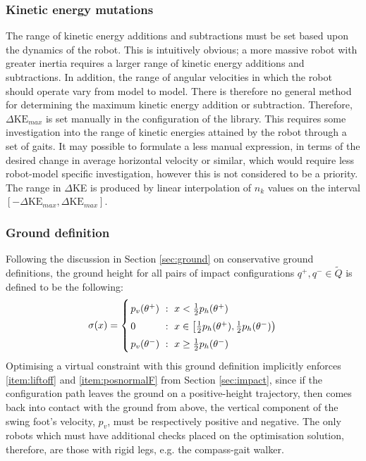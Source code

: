 \subsubsection{Kinetic energy mutations}
The range of kinetic energy additions and subtractions must be set based upon the dynamics of the robot. This is intuitively obvious; a more massive robot with greater inertia requires a larger range of kinetic energy additions and subtractions. In addition, the range of angular velocities in which the robot should operate vary from model to model. There is therefore no general method for determining the maximum kinetic energy addition or subtraction. Therefore, $\Delta\mathrm{KE}_{max}$ is set manually in the configuration of the library. This requires some investigation into the range of kinetic energies attained by the robot through a set of gaits. It may possible to formulate a less manual expression, in terms of the desired change in average horizontal velocity or similar, which would require less robot-model specific investigation, however this is not considered to be a priority. The range in $\Delta$KE is produced by linear interpolation of $n_k$ values on the interval $[-\Delta\mathrm{KE}_{max},\Delta\mathrm{KE}_{max}]$.

\subsubsection{Ground definition}
Following the discussion in Section \ref{sec:ground} on conservative ground definitions, the ground height for all pairs of impact configurations $q^+, q^- \in \tilde{Q}$ is defined to be the following:
\begin{equation}
	\arraycolsep=1.4pt\def\arraystretch{1.5}
	\sigma(x) = \left\{
		\begin{array}{l c l}
			p_v(\theta^+) &~:~& x < \tfrac{1}{2}p_h(\theta^+) \\
			0 &~:~& x \in \left[\tfrac{1}{2}p_h(\theta^+), \tfrac{1}{2}p_h(\theta^-)\right) \\
			p_v(\theta^-) &~:~& x \geq \tfrac{1}{2}p_h(\theta^-)
		\end{array}
	\right.
\end{equation}
Optimising a virtual constraint with this ground definition implicitly enforces \ref{item:liftoff} and \ref{item:posnormalF} from Section \ref{sec:impact}, since if the configuration path leaves the ground on a positive-height trajectory, then comes back into contact with the ground from above, the vertical component of the swing foot's velocity, $p_v$, must be respectively positive and negative. The only robots which must have additional checks placed on the optimisation solution, therefore, are those with rigid legs, e.g. the compass-gait walker.

